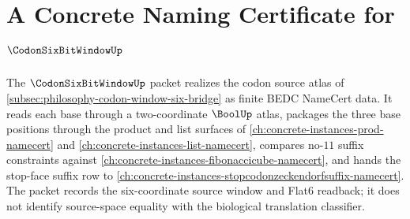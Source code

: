\chapter{A Concrete Naming Certificate for $\CodonSixBitWindowUp$}
\label{ch:concrete-instances-codon-six-bit-window-namecert}

The $\CodonSixBitWindowUp$ packet realizes the codon source atlas of \autoref{subsec:philosophy-codon-window-six-bridge} as finite BEDC NameCert data. It reads each base through a two-coordinate $\BoolUp$ atlas, packages the three base positions through the product and list surfaces of \autoref{ch:concrete-instances-prod-namecert} and \autoref{ch:concrete-instances-list-namecert}, compares no-$11$ suffix constraints against \autoref{ch:concrete-instances-fibonaccicube-namecert}, and hands the stop-face suffix row to \autoref{ch:concrete-instances-stopcodonzeckendorfsuffix-namecert}. The packet records the six-coordinate source window and Flat6 readback; it does not identify source-space equality with the biological translation classifier.


